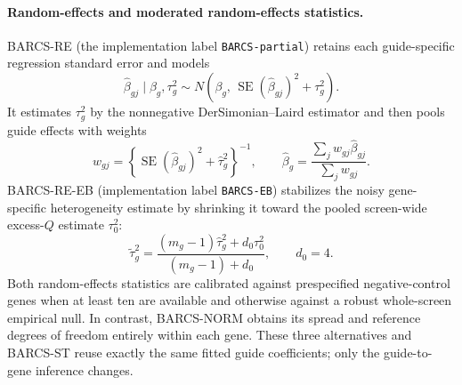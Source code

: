 \paragraph{Random-effects and moderated random-effects statistics.}
BARCS-RE (the implementation label \texttt{BARCS-partial}) retains each
guide-specific regression standard error and models
\begin{equation}
  \widehat{\beta}_{gj}\mid\beta_g,\tau_g^2
  \sim
  N\!\left(
    \beta_g,\,
    \operatorname{SE}(\widehat{\beta}_{gj})^2+\tau_g^2
  \right).
  \label{eq:generandomeffects}
\end{equation}
It estimates $\tau_g^2$ by the nonnegative DerSimonian--Laird estimator and
then pools guide effects with weights
\begin{equation}
  w_{gj}
  =
  \left\{
    \operatorname{SE}(\widehat{\beta}_{gj})^2+
    \widehat{\tau}_g^2
  \right\}^{-1},
  \qquad
  \widehat{\beta}_g
  =
  \frac{\sum_jw_{gj}\widehat{\beta}_{gj}}{\sum_jw_{gj}}.
  \label{eq:genere}
\end{equation}
BARCS-RE-EB (implementation label \texttt{BARCS-EB}) stabilizes the noisy
gene-specific heterogeneity estimate by shrinking it toward the pooled
screen-wide excess-$Q$ estimate $\tau_0^2$:
\begin{equation}
  \widetilde{\tau}_g^2
  =
  \frac{
    (m_g-1)\widehat{\tau}_g^2+d_0\tau_0^2
  }{
    (m_g-1)+d_0
  },
  \qquad d_0=4.
  \label{eq:geneeb}
\end{equation}
Both random-effects statistics are calibrated against prespecified
negative-control genes when at least ten are available and otherwise against a
robust whole-screen empirical null.  In contrast, BARCS-NORM obtains its
spread and reference degrees of freedom entirely within each gene.  These
three alternatives and BARCS-ST reuse exactly the same fitted guide
coefficients; only the guide-to-gene inference changes.

